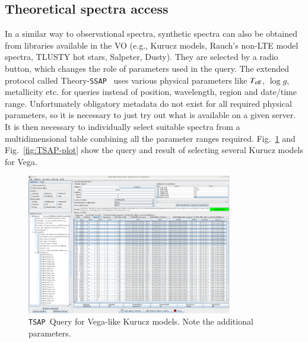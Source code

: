 \documentclass[final,authoryear,5p,times,twocolumn]{elsarticle}
\newcommand{\ssap}{\texttt{SSAP}}
\newcommand{\tsap}{\texttt{TSAP}}
\begin{document}
\subsection{ Theoretical spectra access}
%
In a similar way to observational spectra, synthetic spectra can also be
obtained from libraries available in the VO (e.g., Kurucz models, Rauch's
non-LTE model spectra, TLUSTY hot stars, Salpeter, Dusty). They are selected by
a radio button, which changes the role of parameters used in the query. The
extended protocol called Theory-\ssap\ \citep[hereafter TSAP;][]{ssap} uses
various physical parameters like $T_{\rm eff}$, $\log g$, metallicity etc. for
queries instead of position, wavelength, region and date/time range.
Unfortunately obligatory metadata do not exist for all required physical
parameters, so it is necessary to just try out what is available on a given
server.  It is then necessary to individually select suitable spectra from a
multidimensional table combining all the parameter ranges required.
Fig.~\ref{fig:TSAP-query} and Fig.~\ref{fig:TSAP-plot} show the query and
result of selecting several Kurucz models for Vega.


\begin{figure}[t]
\begin{center}
\includegraphics[width=0.8\textwidth]{TSSA-query.pdf}
\caption{\tsap\ Query for Vega-like Kurucz models. Note the additional
parameters.}
\label{fig:TSAP-query}
\end{center}
\end{figure}
\end{document}
